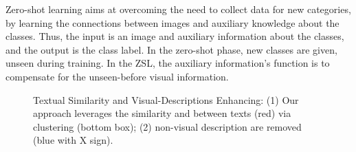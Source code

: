 \documentclass[11pt,a4paper]{article}
\begin{document}
Zero-shot learning aims at overcoming the need to collect data for new categories, by learning the connections between images and auxiliary knowledge about the classes. Thus, the input is an image and auxiliary information about the classes, and the output is the class label. In the zero-shot phase, new classes are given, unseen during training. In the ZSL, the auxiliary information's function is to compensate for the unseen-before visual information.
\par


\begin{figure}[th]
\centering
{}
 \caption{Textual Similarity and Visual-Descriptions Enhancing: (1) Our approach leverages the similarity and  between texts (red) via clustering (bottom box); (2) non-visual description are removed (blue with X sign). }
\label{fig:bird_example}%
\end{figure}
\end{document}
